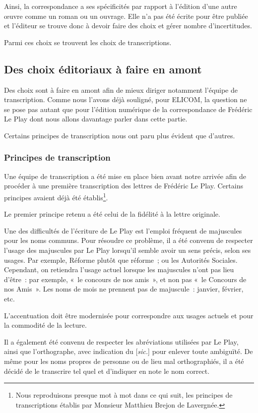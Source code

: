 Ainsi, la correspondance a ses spécificités par rapport à l'édition d'une autre \oe uvre comme un roman ou un ouvrage. Elle n'a pas été écrite pour être publiée et l'éditeur se trouve donc à devoir faire des choix et gérer nombre d'incertitudes.

Parmi ces choix se trouvent les choix de transcriptions.

\subsection{Des choix éditoriaux à faire en amont}

Des choix sont à faire en amont afin de mieux diriger notamment l'équipe de transcription. Comme nous l'avons déjà souligné, pour ELICOM, la question ne se pose pas autant que pour l'édition numérique de la correspondance de Frédéric Le Play dont nous allons davantage parler dans cette partie.

Certains principes de transcription nous ont paru plus évident que d'autres.

\subsubsection{Principes de transcription}

Une équipe de transcription a été mise en place bien avant notre arrivée afin de procéder à une première transcription des lettres de Frédéric Le Play. Certains principes avaient déjà été établis\footnote{Nous reproduisons presque mot à mot dans ce qui suit, les principes de transcriptions établis par Monsieur Matthieu Brejon de Lavergnée.}. 

Le premier principe retenu a été celui de la fidélité à la lettre originale.

Une des difficultés de l'écriture de Le Play est l'emploi fréquent de majuscules pour les noms communs. Pour résoudre ce problème, il a été convenu de respecter l’usage des majuscules par Le Play lorsqu’il semble avoir un sens précis, selon ses usages. Par exemple, Réforme plutôt que réforme ; ou les Autorités Sociales. Cependant, on retiendra l’usage actuel lorsque les majuscules n’ont pas lieu d’être : par exemple, « le concours de nos amis », et non pas « le Concours de nos Amis ». Les noms de mois ne prennent pas de majuscule : janvier, février, etc.

L’accentuation doit être modernisée pour correspondre aux usages actuels et pour la commodité de la lecture.

Il a également été convenu de respecter les abréviations utilisées par Le Play, ainsi que l'orthographe, avec indication du [\emph{sic.}] pour enlever toute ambiguïté. De même pour les noms propres de personne ou de lieu mal orthographiés, il a été décidé de le transcrire tel quel et d'indiquer en note le nom correct.

